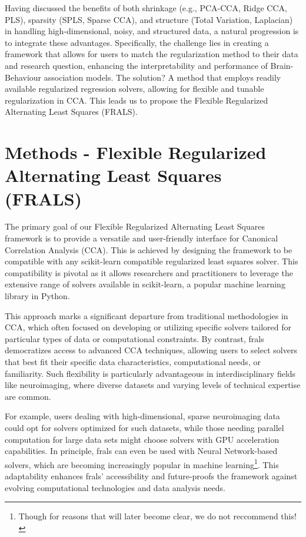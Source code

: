 Having discussed the benefits of both shrinkage (e.g., PCA-CCA, Ridge CCA, PLS), sparsity (SPLS, Sparse CCA), and structure (Total Variation, Laplacian) in handling high-dimensional, noisy, and structured data, a natural progression is to integrate these advantages.
Specifically, the challenge lies in creating a framework that allows for users to match the regularization method to their data and research question, enhancing the interpretability and performance of Brain-Behaviour association models.
The solution?
A method that employs readily available regularized regression solvers, allowing for flexible and tunable regularization in CCA.
This leads us to propose the Flexible Regularized Alternating Least Squares (FRALS).
\newpage


\section{Methods - Flexible Regularized Alternating Least Squares (FRALS)}\label{subsec:flexible-regularized-alternating-least-squares-(frals)}

The primary goal of our Flexible Regularized Alternating Least Squares framework is to provide a versatile and user-friendly interface for Canonical Correlation Analysis (CCA). This is achieved by designing the framework to be compatible with any scikit-learn compatible regularized least squares solver. This compatibility is pivotal as it allows researchers and practitioners to leverage the extensive range of solvers available in scikit-learn, a popular machine learning library in Python.

This approach marks a significant departure from traditional methodologies in CCA, which often focused on developing or utilizing specific solvers tailored for particular types of data or computational constraints.
By contrast, \acrshort{frals} democratizes access to advanced CCA techniques, allowing users to select solvers that best fit their specific data characteristics, computational needs, or familiarity.
Such flexibility is particularly advantageous in interdisciplinary fields like neuroimaging, where diverse datasets and varying levels of technical expertise are common.

For example, users dealing with high-dimensional, sparse neuroimaging data could opt for solvers optimized for such datasets, while those needing parallel computation for large data sets might choose solvers with GPU acceleration capabilities.
In principle, \acrshort{frals} can even be used with Neural Network-based solvers, which are becoming increasingly popular in machine learning\footnote{Though for reasons that will later become clear, we do not reccommend this!}.
This adaptability enhances \acrshort{frals}' accessibility and future-proofs the framework against evolving computational technologies and data analysis needs.

